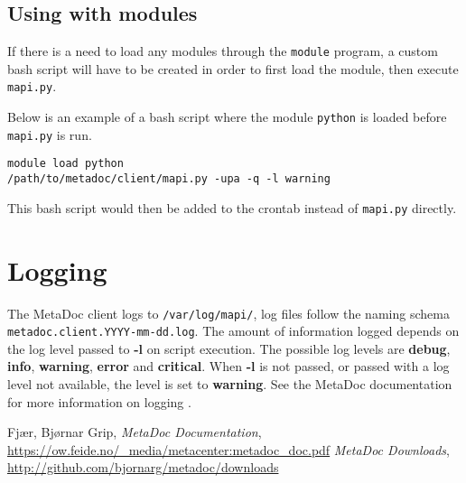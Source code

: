 \documentclass[titlepage, a4paper,10pt]{article}
\begin{document}
\subsection{Using with modules}
If there is a need to load any modules through the \texttt{module} program,
a custom bash script will have to be created in order to first load the module,
then execute \texttt{mapi.py}. 

Below is an example of a bash script where the module \texttt{python} is loaded
before \texttt{mapi.py} is run.

\begin{verbatim}
module load python
/path/to/metadoc/client/mapi.py -upa -q -l warning
\end{verbatim}

This bash script would then be added to the crontab instead of \texttt{mapi.py}
directly.

\section{Logging}
The MetaDoc client logs to \texttt{/var/log/mapi/}, log files follow the naming
schema \texttt{metadoc.client.YYYY-mm-dd.log}. The amount of information logged
depends on the log level passed to \textbf{-l} on script execution. The
possible log levels are \textbf{debug}, \textbf{info}, \textbf{warning},
\textbf{error} and \textbf{critical}. When \textbf{-l} is not passed, or passed
with a log level not available, the level is set to \textbf{warning}. See the
MetaDoc documentation for more information on logging \cite{mdoc}.

\newpage
\begin{thebibliography}{99}
     Fjær, Bjørnar Grip, \textit{MetaDoc Documentation},
        \url{https://ow.feide.no/_media/metacenter:metadoc_doc.pdf}
     \textit{MetaDoc Downloads},
        \url{http://github.com/bjornarg/metadoc/downloads}
\end{thebibliography}
\end{document}
